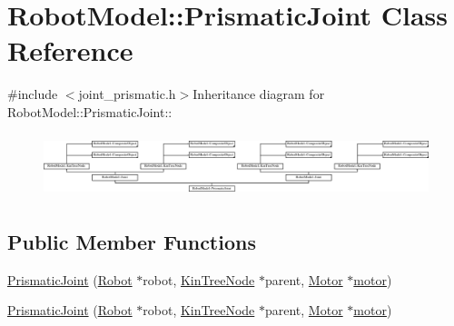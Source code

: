 \hypertarget{class_robot_model_1_1_prismatic_joint}{
\section{RobotModel::PrismaticJoint Class Reference}
\label{class_robot_model_1_1_prismatic_joint}
}


{\ttfamily \#include $<$joint\_\-prismatic.h$>$}Inheritance diagram for RobotModel::PrismaticJoint::\begin{figure}[H]
\begin{center}
\leavevmode
\includegraphics[height=1.8617cm]{class_robot_model_1_1_prismatic_joint}
\end{center}
\end{figure}
\subsection*{Public Member Functions}
\begin{DoxyCompactItemize}
\item 
\hyperlink{class_robot_model_1_1_prismatic_joint_a0a842b2415dafda9a87c854925fdc0b7}{PrismaticJoint} (\hyperlink{class_robot_model_1_1_robot}{Robot} $\ast$robot, \hyperlink{class_robot_model_1_1_kin_tree_node}{KinTreeNode} $\ast$parent, \hyperlink{class_robot_model_1_1_motor}{Motor} $\ast$\hyperlink{class_robot_model_1_1_joint_a8e8165df2271b16ab446028ee6bfa1c6}{motor})
\item 
\hyperlink{class_robot_model_1_1_prismatic_joint_ac519746607de0857d42c6625f4e99e60}{PrismaticJoint} (\hyperlink{class_robot_model_1_1_robot}{Robot} $\ast$robot, \hyperlink{class_robot_model_1_1_kin_tree_node}{KinTreeNode} $\ast$parent, \hyperlink{class_robot_model_1_1_motor}{Motor} $\ast$\hyperlink{class_robot_model_1_1_joint_a8e8165df2271b16ab446028ee6bfa1c6}{motor})
\end{DoxyCompactItemize}


